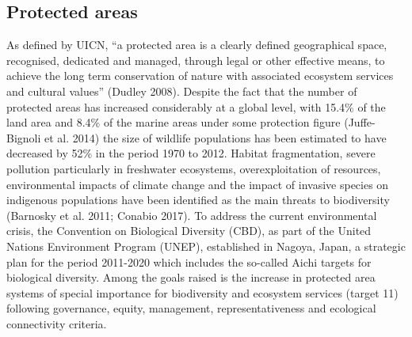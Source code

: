 \documentclass[]{interact}
\theoremstyle{plain}%
\theoremstyle{definition}
\theoremstyle{remark}
\begin{document}
\subsection{Protected areas}\label{protected-areas}

As defined by UICN, ``a protected area is a clearly defined geographical
space, recognised, dedicated and managed, through legal or other
effective means, to achieve the long term conservation of nature with
associated ecosystem services and cultural values'' (Dudley 2008).
Despite the fact that the number of protected areas has increased
considerably at a global level, with 15.4\% of the land area and 8.4\%
of the marine areas under some protection figure (Juffe-Bignoli et al.
2014) the size of wildlife populations has been estimated to have
decreased by 52\% in the period 1970 to 2012. Habitat fragmentation,
severe pollution particularly in freshwater ecosystems, overexploitation
of resources, environmental impacts of climate change and the impact of
invasive species on indigenous populations have been identified as the
main threats to biodiversity (Barnosky et al. 2011; Conabio 2017). To
address the current environmental crisis, the Convention on Biological
Diversity (CBD), as part of the United Nations Environment Program
(UNEP), established in Nagoya, Japan, a strategic plan for the period
2011-2020 which includes the so-called Aichi targets for biological
diversity. Among the goals raised is the increase in protected area
systems of special importance for biodiversity and ecosystem services
(target 11) following governance, equity, management, representativeness
and ecological connectivity criteria.
\end{document}
